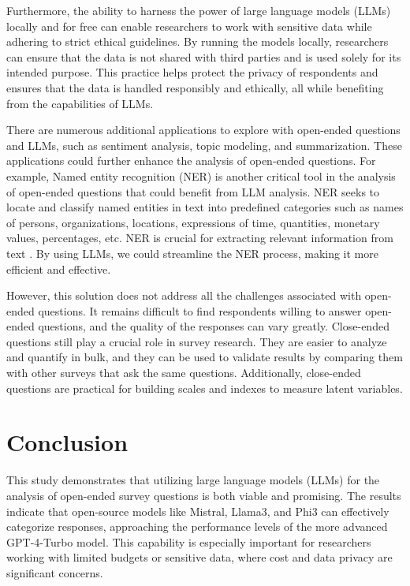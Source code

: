 \documentclass[
  authoryear,
  preprint,
  3p]{elsarticle}
\begin{document}
Furthermore, the ability to harness the power of large language models
(LLMs) locally and for free can enable researchers to work with
sensitive data while adhering to strict ethical guidelines. By running
the models locally, researchers can ensure that the data is not shared
with third parties and is used solely for its intended purpose. This
practice helps protect the privacy of respondents and ensures that the
data is handled responsibly and ethically, all while benefiting from the
capabilities of LLMs.

There are numerous additional applications to explore with open-ended
questions and LLMs, such as sentiment analysis, topic modeling, and
summarization. These applications could further enhance the analysis of
open-ended questions. For example, Named entity recognition (NER) is
another critical tool in the analysis of open-ended questions that could
benefit from LLM analysis. NER seeks to locate and classify named
entities in text into predefined categories such as names of persons,
organizations, locations, expressions of time, quantities, monetary
values, percentages, etc. NER is crucial for extracting relevant
information from text \citep{yadav_bethard19}. By using LLMs, we could
streamline the NER process, making it more efficient and effective.

However, this solution does not address all the challenges associated
with open-ended questions. It remains difficult to find respondents
willing to answer open-ended questions, and the quality of the responses
can vary greatly. Close-ended questions still play a crucial role in
survey research. They are easier to analyze and quantify in bulk, and
they can be used to validate results by comparing them with other
surveys that ask the same questions. Additionally, close-ended questions
are practical for building scales and indexes to measure latent
variables.

\section{Conclusion}\label{conclusion}

This study demonstrates that utilizing large language models (LLMs) for
the analysis of open-ended survey questions is both viable and
promising. The results indicate that open-source models like Mistral,
Llama3, and Phi3 can effectively categorize responses, approaching the
performance levels of the more advanced GPT-4-Turbo model. This
capability is especially important for researchers working with limited
budgets or sensitive data, where cost and data privacy are significant
concerns.
\end{document}
